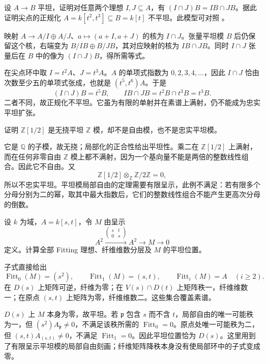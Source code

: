 \begin{exercise}\label{g5:ex:normalization-not-flat}
	设 \(A\to B\) 平坦，证明对任意两个理想 \(I,J\subseteq A\)，有
	\((I\cap J)B=IB\cap JB\)。据此证明尖点的正规化
	\(A=k[t^2,t^3]\subseteq B=k[t]\) 不平坦。此模型可对照 \cite[第7节，定理7.4后的例，第49页]{Matsumura1989}。
\end{exercise}
\begin{solution}
	映射 \(A\to A/I\oplus A/J\)、\(a\mapsto(a+I,a+J)\) 的核为 \(I\cap J\)。张量平坦模 \(B\) 后仍保留这个核，右端变为 \(B/IB\oplus B/JB\)，其对应映射的核为 \(IB\cap JB\)。同时 \(I\cap J\) 张量后在 \(B\) 中的像为 \((I\cap J)B\)，得所需等式。

	在尖点环中取 \(I=t^2A\)、\(J=t^3A\)。\(A\) 的单项式指数为 \(0,2,3,4,\ldots\)，因此 \(I\cap J\) 恰由次数至少五的单项式张成，也就是 \((t^5,t^6)A\)。于是
	\[
		(I\cap J)B=t^5B,\qquad IB\cap JB=t^2B\cap t^3B=t^3B.
	\]
	二者不同，故正规化不平坦。它虽为有限的单射并在素谱上满射，仍不能成为忠实平坦扩张。
\end{solution}

\begin{exercise}\label{g5:ex:localization-flat-not-free}
	证明 \(\mathbb Z[1/2]\) 是无挠平坦 \(\mathbb Z\) 模，却不是自由模，也不是忠实平坦模。
\end{exercise}
\begin{solution}
	它是 \(\mathbb Q\) 的子模，故无挠；局部化的正合性给出平坦性。乘二在 \(\mathbb Z[1/2]\) 上满射，而在任何非零自由 \(\mathbb Z\) 模上都不满射，因为一个基向量不能是两倍的整数线性组合。因此它不自由。又
	\[
		\mathbb Z[1/2]\otimes_{\mathbb Z}\mathbb Z/2\mathbb Z=0,
	\]
	所以不忠实平坦。平坦模局部自由的定理需要有限呈示，此例不满足：若有限多个分母分别为二的幂，取其中最大指数后，它们的整数线性组合不能产生更高次分母的倒数。
\end{solution}

\begin{exercise}\label{g5:ex:fitting-triangular-family}
	设 \(k\) 为域，\(A=k[s,t]\)，令 \(M\) 由呈示
	\[
		A^2\xrightarrow{\left(\begin{smallmatrix}s&t\\0&s\end{smallmatrix}\right)}
		A^2\longrightarrow M\longrightarrow0
	\]
	定义。计算全部 Fitting 理想、纤维维数分层及 \(M\) 的平坦位置。
\end{exercise}
\begin{solution}
	子式直接给出
	\[
		\operatorname{Fitt}_0(M)=(s^2),\qquad
		\operatorname{Fitt}_1(M)=(s,t),\qquad
		\operatorname{Fitt}_i(M)=A\quad(i\geq2).
	\]
	在 \(D(s)\) 上矩阵可逆，纤维为零；在 \(V(s)\cap D(t)\) 上矩阵秩一，纤维维数一；在原点 \((s,t)\) 上矩阵为零，纤维维数二。这些集合覆盖素谱。

	\(D(s)\) 上 \(M\) 本身为零，故平坦。若 \(\mathfrak p\) 包含 \(s\) 而不含 \(t\)，局部自由的唯一可能秩为一，但 \((s^2)A_{\mathfrak p}\ne0\)，不满足该秩所需的 \(\operatorname{Fitt}_0=0\)。原点处唯一可能秩为二，但 \((s,t)A_{(s,t)}\ne0\)，不满足 \(\operatorname{Fitt}_1=0\)。因此平坦位置恰为 \(D(s)\)。这里用到了有限呈示平坦模的局部自由刻画；纤维矩阵降秩本身没有使局部环中的子式变成零。
\end{solution}

